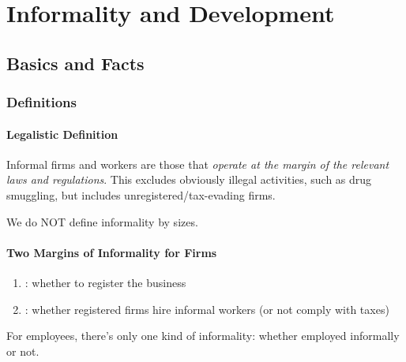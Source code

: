 \chapter{Informality and Development}



\section{Basics and Facts}
    \subsection{Definitions}
        \subsubsection{Legalistic Definition}
        
            Informal firms and workers are those that \emph{operate at the margin of the relevant laws and regulations}. This excludes obviously illegal activities, such as drug smuggling, but includes unregistered/tax-evading firms.
            
            We do NOT define informality by sizes.
            
        \subsubsection{Two Margins of Informality for Firms}
            \begin{enumerate}
                \item {}: whether to register the business
                \item {}: whether registered firms hire informal workers (or not comply with taxes)
            \end{enumerate}
            For employees, there's only one kind of informality: whether employed informally or not.
            
